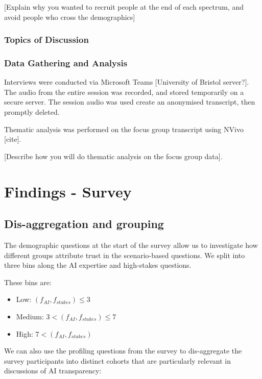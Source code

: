 \documentclass[manuscript,screen,review]{acmart}
\begin{document}
[Explain why you wanted to recruit people at the end of each spectrum, and avoid people who cross the demographics]

\subsubsection{Topics of Discussion}



\subsubsection{Data Gathering and Analysis}
Interviews were conducted via Microsoft Teams [University of Bristol server?]. The audio from the entire session was recorded, and stored temporarily on a secure server. The session audio was used create an anonymised transcript, then promptly deleted. 

Thematic analysis was performed on the focus group transcript using NVivo [cite]. 

[Describe how you will do thematic analysis on the focus group data].








\newpage
\section{Findings - Survey}

\subsection{Dis-aggregation and grouping}

The demographic questions at the start of the survey allow us to investigate how different groups attribute trust in the scenario-based questions. We split into three bins along the AI expertise and high-stakes questions. 

These bins are:

\begin{itemize}
    \item Low: $(f_{AI}, f_{stakes}) \leq 3$
    \item Medium: $3 < (f_{AI}, f_{stakes}) \leq 7$
    \item High: $7 < (f_{AI}, f_{stakes})$
\end{itemize}
We can also use the profiling questions from the survey to dis-aggregate the survey participants into distinct cohorts that are particularly relevant in discussions of AI transparency: 
\end{document}
